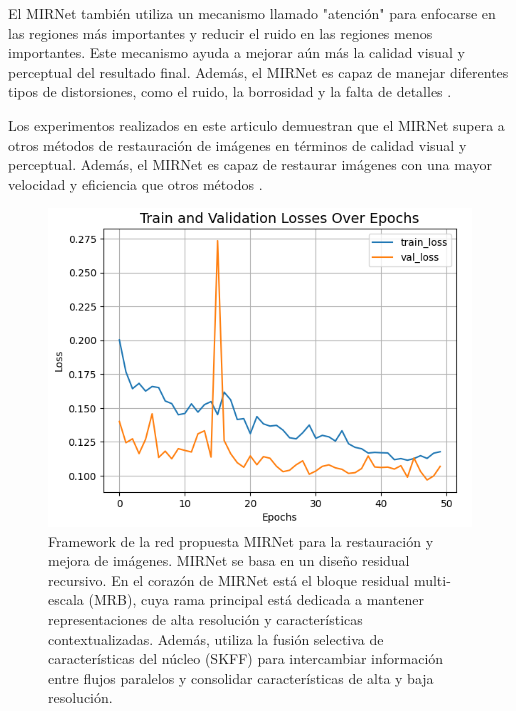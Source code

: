 \documentclass[a4paper,
               ]{jacow}
\begin{document}
El MIRNet también utiliza un mecanismo llamado "atención" para enfocarse en las regiones más importantes y reducir el ruido en las regiones menos importantes. Este mecanismo ayuda a mejorar aún más la calidad visual y perceptual del resultado final. Además, el MIRNet es capaz de manejar diferentes tipos de distorsiones, como el ruido, la borrosidad y la falta de detalles \cite{tian2020learning}.

Los experimentos realizados en este articulo demuestran que el MIRNet supera a otros métodos de restauración de imágenes en términos de calidad visual y perceptual. Además, el MIRNet es capaz de restaurar imágenes con una mayor velocidad y eficiencia que otros métodos \cite{tian2020learning}.

\begin{figure}[!h]
    \centering
    \includegraphics*[width=.5\textwidth]{ll-train-losses-ep}
    \caption{Framework de la red propuesta MIRNet para la restauración y mejora de imágenes. MIRNet se basa en un diseño residual recursivo. En el corazón de MIRNet está el bloque residual multi-escala (MRB), cuya rama principal está dedicada a mantener representaciones de alta resolución y características contextualizadas. Además, utiliza la fusión selectiva de características del núcleo (SKFF) para intercambiar información entre flujos paralelos y consolidar características de alta y baja resolución.}
    \label{fig:ll_train_losses_ep}
\end{figure}
\end{document}
